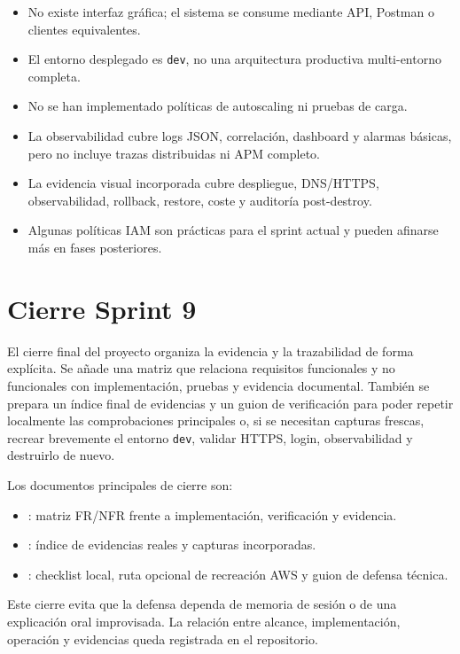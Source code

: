\begin{itemize}
  \item No existe interfaz gráfica; el sistema se consume mediante API, Postman o clientes equivalentes.
  \item El entorno desplegado es \texttt{dev}, no una arquitectura productiva multi-entorno completa.
  \item No se han implementado políticas de autoscaling ni pruebas de carga.
  \item La observabilidad cubre logs JSON, correlación, dashboard y alarmas básicas, pero no incluye trazas distribuidas ni APM completo.
  \item La evidencia visual incorporada cubre despliegue, DNS/HTTPS, observabilidad, rollback, restore, coste y auditoría post-destroy.
  \item Algunas políticas IAM son prácticas para el sprint actual y pueden afinarse más en fases posteriores.
\end{itemize}

\section{Cierre Sprint 9}
\label{sec:cierre-sprint9}

El cierre final del proyecto organiza la evidencia y la trazabilidad de forma explícita. Se añade una matriz que relaciona requisitos funcionales y no funcionales con implementación, pruebas y evidencia documental. También se prepara un índice final de evidencias y un guion de verificación para poder repetir localmente las comprobaciones principales o, si se necesitan capturas frescas, recrear brevemente el entorno \texttt{dev}, validar HTTPS, login, observabilidad y destruirlo de nuevo.

Los documentos principales de cierre son:

\begin{itemize}
  \item {}: matriz FR/NFR frente a implementación, verificación y evidencia.
  \item {}: índice de evidencias reales y capturas incorporadas.
  \item {}: checklist local, ruta opcional de recreación AWS y guion de defensa técnica.
\end{itemize}

Este cierre evita que la defensa dependa de memoria de sesión o de una explicación oral improvisada. La relación entre alcance, implementación, operación y evidencias queda registrada en el repositorio.
